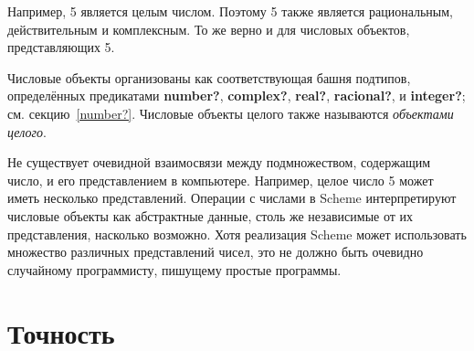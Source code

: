 Например, 5 является целым числом. Поэтому 5 также является рациональным, действительным и
комплексным. То же верно и для числовых объектов, представляющих 5.


Числовые объекты организованы как соответствующая башня подтипов, определённых предикатами
{\cf\bfseries number?}, {\cf\bfseries complex?}, {\cf\bfseries real?}, {\cf\bfseries racional?},
и {\cf\bfseries integer?}; см. секцию~\ref{number?}. Числовые объекты целого также
называются \textit{объектами целого}.

Не существует очевидной взаимосвязи между подмножеством, содержащим число, и его представлением
в компьютере. Например, целое число 5 может иметь несколько представлений. Операции с числами в
Scheme интерпретируют числовые объекты как абстрактные данные, столь же независимые от их
представления, насколько возможно. Хотя реализация Scheme может использовать множество различных
представлений чисел, это не должно быть очевидно случайному программисту, пишущему простые
программы.

\section{Точность}
\label{exactly}


